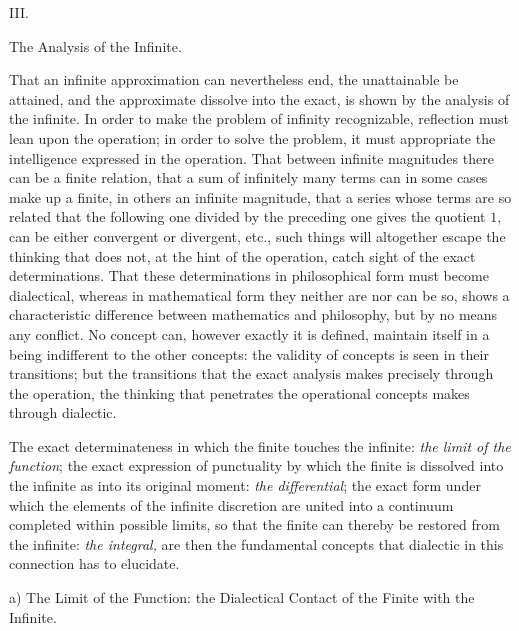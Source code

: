 \documentclass[12pt,a4paper,openany]{book}
\newcommand{\opage}[1]{\marginnote{\footnotesize\textit{[#1]}}}
\begin{document}
\begin{center}III.\end{center}

\begin{center}The Analysis of the Infinite.\end{center}

That an infinite approximation can nevertheless end, the unattainable be attained, and the approximate dissolve into the exact, is shown by the analysis of the infinite. In order to make the problem of infinity recognizable, reflection must lean upon
\setcounter{footnote}{0}%
\opage{57}the operation; in order to solve the problem, it must appropriate the intelligence expressed in the operation. That between infinite magnitudes there can be a finite relation, that a sum of infinitely many terms can in some cases make up a finite, in others an infinite magnitude, that a series whose terms are so related that the following one divided by the preceding one gives the quotient $1,$ can be either convergent or divergent, etc., such things will altogether escape the thinking that does not, at the hint of the operation, catch sight of the exact determinations. That these determinations in philosophical form must become dialectical, whereas in mathematical form they neither are nor can be so, shows a characteristic difference between mathematics and philosophy, but by no means any conflict. No concept can, however exactly it is defined, maintain itself in a being indifferent to the other concepts: the validity of concepts is seen in their transitions; but the transitions that the exact analysis makes precisely through the operation, the thinking that penetrates the operational concepts makes through dialectic.

The exact determinateness in which the finite touches the infinite: \emph{the limit of the function}; the exact expression of punctuality by which the finite is dissolved into the infinite as into its original moment: \emph{the differential}; the exact form under which the elements of the infinite discretion are united into a continuum completed within possible limits, so that the finite can thereby be restored from the infinite: \emph{the integral,} are then the fundamental concepts that dialectic in this connection has to elucidate.

\begin{center}a) The Limit of the Function: the Dialectical Contact of the Finite with the Infinite.\end{center}
\end{document}
